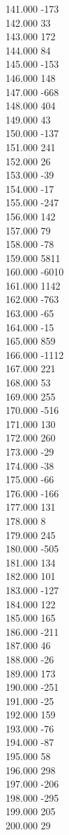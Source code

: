 { 141.000	-173 \\
 142.000	33 \\
 143.000	172 \\
 144.000	84 \\
 145.000	-153 \\
 146.000	148 \\
 147.000	-668 \\
 148.000	404 \\
 149.000	43 \\
 150.000	-137 \\
 151.000	241 \\
 152.000	26 \\
 153.000	-39 \\
 154.000	-17 \\
 155.000	-247 \\
 156.000	142 \\
 157.000	79 \\
 158.000	-78 \\
 159.000	5811 \\
 160.000	-6010 \\
 161.000	1142 \\
 162.000	-763 \\
 163.000	-65 \\
 164.000	-15 \\
 165.000	859 \\
 166.000	-1112 \\
 167.000	221 \\
 168.000	53 \\
 169.000	255 \\
 170.000	-516 \\
 171.000	130 \\
 172.000	260 \\
 173.000	-29 \\
 174.000	-38 \\
 175.000	-66 \\
 176.000	-166 \\
 177.000	131 \\
 178.000	8 \\
 179.000	245 \\
 180.000	-505 \\
 181.000	134 \\
 182.000	101 \\
 183.000	-127 \\
 184.000	122 \\
 185.000	165 \\
 186.000	-211 \\
 187.000	46 \\
 188.000	-26 \\
 189.000	173 \\
 190.000	-251 \\
 191.000	-25 \\
 192.000	159 \\
 193.000	-76 \\
 194.000	-87 \\
 195.000	58 \\
 196.000	298 \\
 197.000	-206 \\
 198.000	-295 \\
 199.000	205 \\
 200.000	29 \\
}
